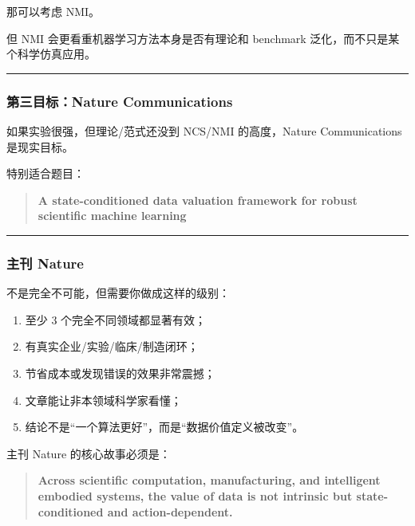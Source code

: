 \documentclass[
  12pt,
]{ctexart}
\providecommand{\tightlist}{%
  \setlength{\itemsep}{0pt}\setlength{\parskip}{0pt}}
\begin{document}
那可以考虑 NMI。

但 NMI 会更看重机器学习方法本身是否有理论和 benchmark
泛化，而不只是某个科学仿真应用。

\begin{center}\rule{0.5\linewidth}{0.5pt}\end{center}

\subsubsection{第三目标：Nature
Communications}\label{ux7b2cux4e09ux76eeux6807nature-communications}

如果实验很强，但理论/范式还没到 NCS/NMI 的高度，Nature Communications
是现实目标。

特别适合题目：

\begin{quote}
\textbf{A state-conditioned data valuation framework for robust
scientific machine learning}
\end{quote}

\begin{center}\rule{0.5\linewidth}{0.5pt}\end{center}

\subsubsection{主刊 Nature}\label{ux4e3bux520a-nature}

不是完全不可能，但需要你做成这样的级别：

\begin{enumerate}
\def\labelenumi{\arabic{enumi}.}
\tightlist
\item
  至少 3 个完全不同领域都显著有效；
\item
  有真实企业/实验/临床/制造闭环；
\item
  节省成本或发现错误的效果非常震撼；
\item
  文章能让非本领域科学家看懂；
\item
  结论不是``一个算法更好''，而是``数据价值定义被改变''。
\end{enumerate}

主刊 Nature 的核心故事必须是：

\begin{quote}
\textbf{Across scientific computation, manufacturing, and intelligent
embodied systems, the value of data is not intrinsic but
state-conditioned and action-dependent.}
\end{quote}
\end{document}
